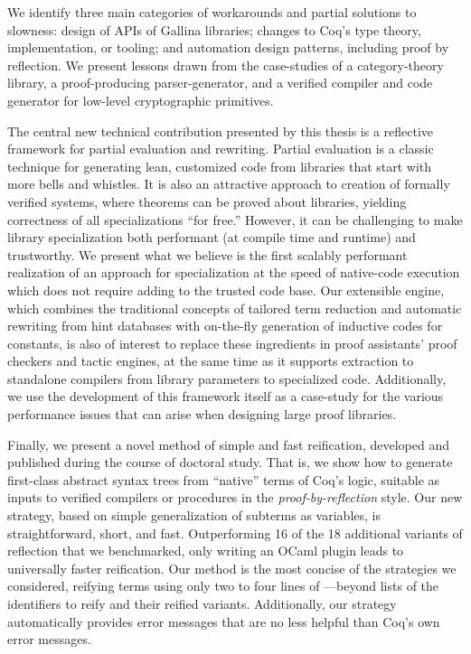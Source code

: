 We identify three main categories of workarounds and partial solutions to slowness: design of APIs of Gallina libraries; changes to Coq's type theory, implementation, or tooling; and automation design patterns, including proof by reflection.
We present lessons drawn from the case-studies of a category-theory library, a proof-producing parser-generator, and a verified compiler and code generator for low-level cryptographic primitives.

The central new technical contribution presented by this thesis is a reflective framework for partial evaluation and rewriting.
Partial evaluation is a classic technique for generating lean, customized code from libraries that start with more bells and whistles.
It is also an attractive approach to creation of formally verified systems, where theorems can be proved about libraries, yielding correctness of all specializations ``for free.''
However, it can be challenging to make library specialization both performant (at compile time and runtime) and trustworthy.
We present what we believe is the first scalably performant realization of an approach for specialization at the speed of native-code execution which does not require adding to the trusted code base.
Our extensible engine, which combines the traditional concepts of tailored term reduction and automatic rewriting from hint databases with on-the-fly generation of inductive codes for constants, is also of interest to replace these ingredients in proof assistants' proof checkers and tactic engines, at the same time as it supports extraction to standalone compilers from library parameters to specialized code.
Additionally, we use the development of this framework itself as a case-study for the various performance issues that can arise when designing large proof libraries.

Finally, we present a novel method of simple and fast reification, developed and published during the course of doctoral study.
That is, we show how to generate first-class abstract syntax trees from ``native'' terms of Coq's logic, suitable as inputs to verified compilers or procedures in the \emph{proof-by-reflection} style.
Our new strategy, based on simple generalization of subterms as variables, is straightforward, short, and fast.
Outperforming 16 of the 18 additional variants of reflection that we benchmarked, only writing an OCaml plugin leads to universally faster reification.
Our method is the most concise of the strategies we considered, reifying terms using only two to four lines of \Ltac---beyond lists of the identifiers to reify and their reified variants.
Additionally, our strategy automatically provides error messages that are no less helpful than Coq's own error messages.
